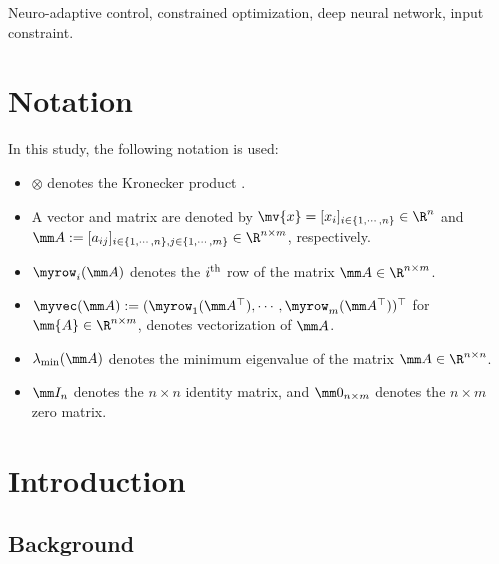 \documentclass[lettersize,journal]{IEEEtran}
\begin{document}
\begin{IEEEkeywords}
    Neuro-adaptive control, constrained optimization, deep neural network, input constraint.
\end{IEEEkeywords}

\section*{Notation}
In this study, the following notation is used:

\begin{itemize}
    \item $\otimes$ denotes the Kronecker product \cite[Chap. 7 Def. 7.1.2]{Bernstein:2009aa}.
    \item A vector and matrix are denoted by $\mv{x}=[x_i]_{i\in\{1,\cdots,n\}}\in\R^n$ and $
        \mm A
        := 
        [a_{ij}]
        _{
            i\in\{1,\cdots,n\},j\in\{1,\cdots ,m\}
        }\allowbreak\in\R^{n\times m}
        $, respectively.
    \item $\myrow_i(\mm A)$ denotes the $i\textsuperscript{th}$ row of the matrix $\mm A\in\R^{n\times m}$. 
    \item $\myvec(\mm A):=(\myrow_1(\mm A^\top),\cdots,\myrow_m(\mm A^\top)  )^\top$ for $\mm{A}\in\R^{n\times m}$, denotes vectorization of $\mm A$.
    \item $\lambda_{\min}(\mm A)$ denotes the minimum eigenvalue of the matrix $\mm A\in\R^{n\times n}$.
    \item $\mm I_n$ denotes the $n\times n$ identity matrix, and $\mm 0_{n\times m}$ denotes the $n\times m$ zero matrix.
\end{itemize}

\section{Introduction}

\subsection{Background}
\end{document}
